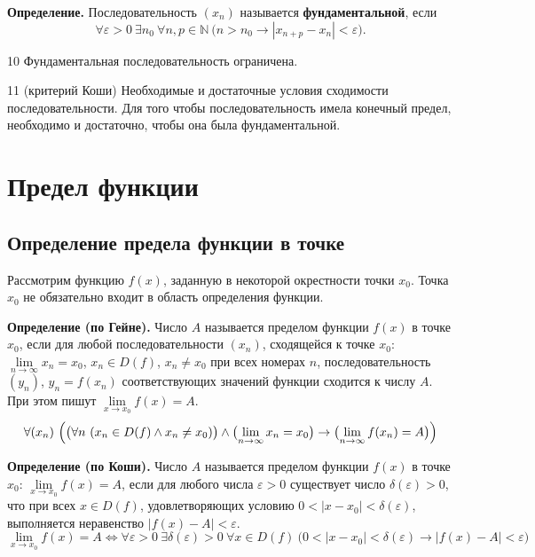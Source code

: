 \documentclass[a4paper,11pt]{article}
\begin{document}
\begin{opr}
\textbf{Определение.}
  Последовательность $(x_n)$ называется \textbf{фундаментальной}, если
  \[
    \forall \varepsilon > 0\ \exists n_0\ \forall n, p \in \mathbb{N}\
    \bigl( n > n_0 \rightarrow |x_{n+p} - x_n| < \varepsilon \bigr).
  \]
\end{opr}

\begin{teor}{10}
  Фундаментальная последовательность ограничена.
\end{teor}

\begin{teor}{11 (критерий Коши)}
  Необходимые и достаточные условия сходимости последовательности.
  Для того чтобы последовательность имела конечный предел, необходимо и достаточно,
  чтобы она была фундаментальной.
\end{teor}

\section{Предел функции}

\subsection{Определение предела функции в точке}

Рассмотрим функцию $f(x)$, заданную в некоторой окрестности точки $x_0$.
Точка $x_0$ не обязательно входит в область определения функции.

\begin{opr}
\textbf{Определение (по Гейне).}
  Число $A$ называется пределом функции $f(x)$ в точке $x_0$, если для любой
  последовательности $(x_n)$, сходящейся к точке $x_0$: $\lim\limits_{n \to \infty} x_n = x_0$,
  $x_n \in D(f)$, $x_n \ne x_0$ при всех номерах $n$, последовательность $(y_n)$,
  $y_n = f(x_n)$ соответствующих значений функции сходится к числу $A$.
  При этом пишут $\lim\limits_{x \to x_0} f(x) = A$.
  \[
    \forall (x_n)\ \Bigl( \bigl( \forall n\ (x_n \in D(f) \wedge x_n \ne x_0) \bigr)
      \wedge \bigl( \lim_{n \to \infty} x_n = x_0 \bigr)
      \rightarrow \bigl( \lim_{n \to \infty} f(x_n) = A \bigr) \Bigr)
  \]
\end{opr}

\begin{opr}
\textbf{Определение (по Коши).}
  Число $A$ называется пределом функции $f(x)$ в точке $x_0$:
  $\lim\limits_{x \to x_0} f(x) = A$, если для любого числа $\varepsilon > 0$ существует
  число $\delta(\varepsilon) > 0$, что при всех $x \in D(f)$, удовлетворяющих условию
  $0 < |x - x_0| < \delta(\varepsilon)$, выполняется неравенство $|f(x) - A| < \varepsilon$.
  \[
    \lim_{x \to x_0} f(x) = A \Leftrightarrow \forall \varepsilon > 0\ \exists \delta(\varepsilon) > 0\
    \forall x \in D(f)\ \bigl( 0 < |x - x_0| < \delta(\varepsilon) \rightarrow |f(x) - A| < \varepsilon \bigr)
  \]
\end{opr}
\end{document}
